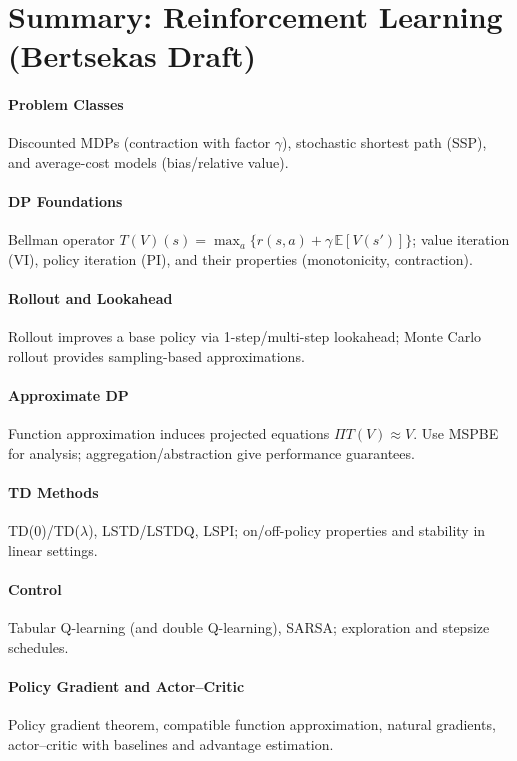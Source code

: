 
\section*{Summary: Reinforcement Learning (Bertsekas Draft)}

\paragraph{Problem Classes}
Discounted MDPs (contraction with factor $\gamma$), stochastic shortest path (SSP), and average-cost models (bias/relative value).

\paragraph{DP Foundations}
Bellman operator $T(V)(s)=\max_a\{ r(s,a)+\gamma\,\mathbb{E}[V(s')]\}$; value iteration (VI), policy iteration (PI), and their properties (monotonicity, contraction).

\paragraph{Rollout and Lookahead}
Rollout improves a base policy via 1-step/multi-step lookahead; Monte Carlo rollout provides sampling-based approximations.

\paragraph{Approximate DP}
Function approximation induces projected equations $\Pi T(V)\approx V$. Use MSPBE for analysis; aggregation/abstraction give performance guarantees.

\paragraph{TD Methods}
TD(0)/TD($\lambda$), LSTD/LSTDQ, LSPI; on/off-policy properties and stability in linear settings.

\paragraph{Control}
Tabular Q-learning (and double Q-learning), SARSA; exploration and stepsize schedules.

\paragraph{Policy Gradient and Actor--Critic}
Policy gradient theorem, compatible function approximation, natural gradients, actor--critic with baselines and advantage estimation.

